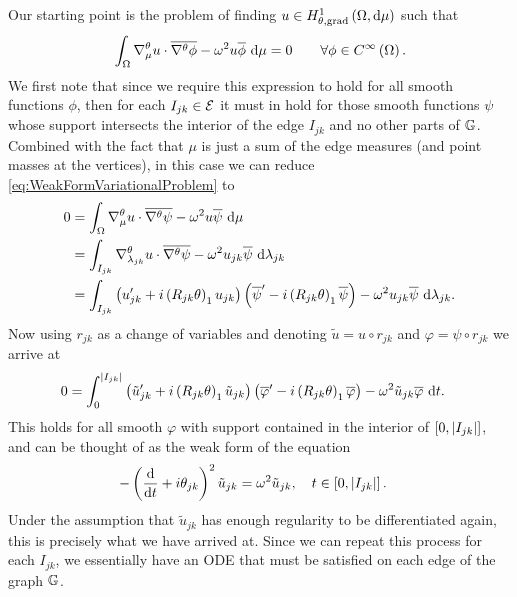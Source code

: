 Our starting point is the problem of finding $u\in H^1_{\theta, \mathrm{grad}}\left( \Omega, \mathrm{d}\mu \right)$ such that 
\begin{align} \label{eq:WeakFormVariationalProblem}
	\int_{\Omega}\nabla^{\theta}_\mu u \cdot \overline{\nabla^{\theta}\phi} - \omega^2 u\overline{\phi} \ \mathrm{d}\mu &= 0
	&\quad\forall \phi\in C^{\infty}\left( \Omega \right).
\end{align}
We first note that since we require this expression to hold for all smooth functions $\phi$, then for each $I_{jk}\in \mathcal{E}$ it must in hold for those smooth functions $\psi$ whose support intersects the interior of the edge $I_{jk}$ and no other parts of $\mathbb{G}$.
Combined with the fact that $\mu$ is just a sum of the edge measures (and point masses at the vertices), in this case we can reduce \eqref{eq:WeakFormVariationalProblem} to
\begin{align*}
	0 &= \int_{\Omega}\nabla^{\theta}_\mu u \cdot \overline{\nabla^{\theta}\psi} - \omega^2 u\overline{\psi} \ \mathrm{d}\mu \\
	&= \int_{I_{jk}} \nabla^{\theta}_{\lambda_{jk}}u \cdot \overline{\nabla^{\theta}\psi} - \omega^2 u_{jk}\overline{\psi}  \ \mathrm{d}\lambda_{jk} \\
	&= \int_{I_{jk}} \left( u_{jk}' + i\left( R_{jk}\theta \right)_1 u_{jk} \right)\left( \overline{\psi}' - i\left( R_{jk}\theta \right)_1 \overline{\psi}  \right) - \omega^2 u_{jk}\overline{\psi}  \ \mathrm{d}\lambda_{jk}.
\end{align*}
Now using $r_{jk}$ as a change of variables and denoting $\tilde{u} = u \circ r_{jk}$ and $\varphi = \psi\circ r_{jk}$ we arrive at
\begin{align*}
	0 &= \int_{0}^{\left\lvert I_{jk} \right\rvert} \left( \tilde{u}_{jk}' + i\left( R_{jk}\theta \right)_1 \tilde{u}_{jk} \right)\left( \overline{\varphi}' - i\left( R_{jk}\theta \right)_1 \overline{\varphi}  \right) - \omega^2 \tilde{u}_{jk}\overline{\varphi} \ \mathrm{d} t .
\end{align*}
This holds for all smooth $\varphi$ with support contained in the interior of $\left[ 0,\left\lvert I_{jk} \right\rvert \right]$, and can be thought of as the weak form of the equation
\begin{align*}
	-\left( \dfrac{\mathrm{d}}{\mathrm{d}t} + i\theta_{jk} \right)^2 \tilde{u}_{jk} &= \omega^2 \tilde{u}_{jk}, \quad t\in\left[ 0,\left\lvert I_{jk} \right\rvert \right].
\end{align*}
Under the assumption that $\tilde{u}_{jk}$ has enough regularity to be differentiated again, this is precisely what we have arrived at.
Since we can repeat this process for each $I_{jk}$, we essentially have an ODE that must be satisfied on each edge of the graph $\mathbb{G}$. \newline

